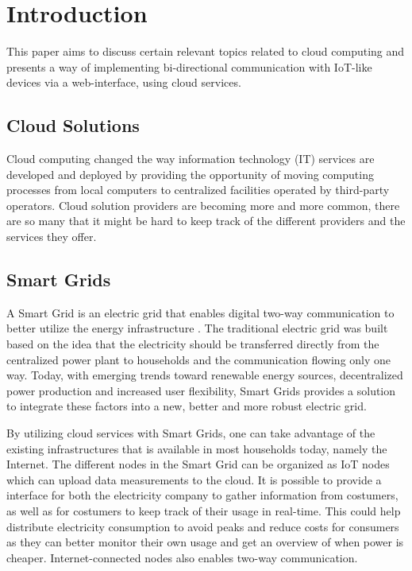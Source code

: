 \chapter{Introduction}
This paper aims to discuss certain relevant topics related to cloud computing and presents a way of implementing bi-directional communication with IoT-like devices via a web-interface, using cloud services. 

\section{Cloud Solutions}
Cloud computing changed the way information technology (IT) services are developed and deployed by providing the opportunity of moving computing processes from local computers to centralized facilities operated by third-party operators.  
Cloud solution providers are becoming more and more common, there are so many that it might be hard to keep track of the different providers and the services they offer. 

\section{Smart Grids}
A Smart Grid is an electric grid that enables digital two-way communication to better utilize the energy infrastructure \cite{smartgrid}. The traditional electric grid was built based on the idea that the electricity should be transferred directly from the centralized power plant to households and the communication flowing only one way. Today, with emerging trends toward renewable energy sources, decentralized power production and increased user flexibility, Smart Grids provides a solution to integrate these factors into a new, better and more robust electric grid. 

By utilizing cloud services with Smart Grids, one can take advantage of the existing infrastructures that is available in most households today, namely the Internet. The different nodes in the Smart Grid can be organized as IoT nodes which can upload data measurements to the cloud. It is possible to provide a interface for both the electricity company to gather information from costumers, as well as for costumers to keep track of their usage in real-time. This could help distribute electricity consumption to avoid peaks and reduce costs for consumers as they can better monitor their own usage and get an overview of when power is cheaper. Internet-connected nodes also enables two-way communication. 


